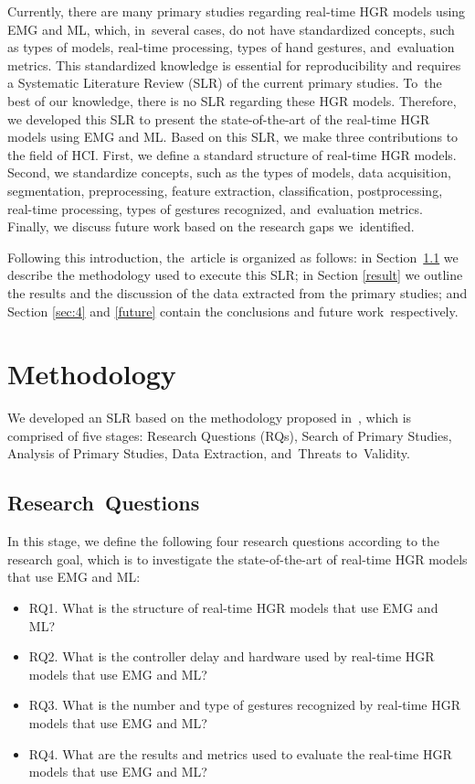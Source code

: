 \documentclass[sensors,review,accept,moreauthors,pdftex]{Definitions/mdpi}
\begin{document}
Currently, there are many primary studies regarding real-time HGR models using EMG and ML, which, in~several cases, do not have standardized concepts, such as types of models, real-time processing, types of hand gestures, and~evaluation metrics. This standardized knowledge is essential for reproducibility and requires a Systematic Literature Review (SLR) of the current primary studies. To~the best of our knowledge, there is no SLR regarding these HGR models. Therefore, we developed this SLR to present the state-of-the-art of the real-time HGR models using EMG and ML. Based on this SLR, we make three contributions to the field of HCI. First, we define a standard structure of real-time HGR models. Second, we standardize concepts, such as the types of models, data acquisition, segmentation, preprocessing, feature extraction, classification, postprocessing, real-time processing, types of gestures recognized, and~evaluation metrics. Finally, we discuss future work based on the research gaps we~identified.


Following this introduction, the~article is organized as follows: in Section~\ref{sec:2.1} we describe the methodology used to execute this SLR; in Section \ref{result} we outline the results and the discussion of the data extracted from the primary studies; and Section \ref{sec:4} and \ref{future} contain the conclusions and future work~respectively.  



\section{Methodology} \label{sec:2}

We developed an SLR based on the methodology proposed in~\cite{kitchenham2004procedures,kitchenham2009systematic}, which is comprised of five stages: Research Questions (RQs), Search of Primary Studies, Analysis of Primary Studies, Data Extraction, and~Threats to~Validity.

\subsection{Research~Questions} \label{sec:2.1}

In this stage, we define the following four research questions according to the research goal, which is to investigate the state-of-the-art of real-time HGR models that use EMG and ML:

\begin{itemize}
	\item RQ1. What is the structure of real-time HGR models that use EMG and ML?
	\item RQ2. What is the controller delay and hardware used by real-time HGR models that use EMG and ML?
	\item RQ3. What is the number and type of gestures recognized by real-time HGR models that use EMG and ML?
	\item RQ4. What are the results and metrics used to evaluate the real-time HGR models that use EMG and ML?
\end{itemize}
\end{document}
